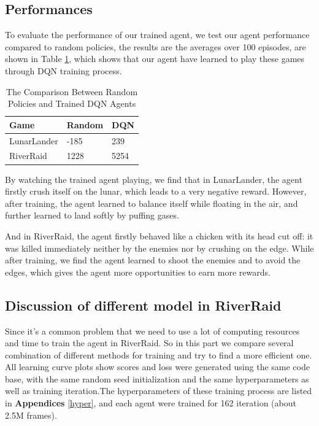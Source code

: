 \documentclass[12pt]{article}
\begin{document}
\subsection{Performances}
To evaluate the performance of our trained agent, we test our agent performance compared to random policies, the results are the averages over 100 episodes, are shown in Table \ref{result}, which shows that our agent have learned to play these games through DQN training process.
\begin{table}[!htp]
    \caption{\label{result}The Comparison Between Random Policies and Trained DQN Agents}
    \centering
    \begin{tabular}{p{100pt}p{100pt}p{50pt}}
    \toprule
    Game & Random & DQN\\
    \midrule
    LunarLander & -185 & 239\\
    RiverRaid & 1228 & 5254\\ 
    \bottomrule
    \end{tabular}
\end{table}

By watching the trained agent playing, we find that in LunarLander, the agent firstly crush itself on the lunar, which leads to a very negative reward. However, after training, the agent learned to balance itself while floating in the air, and further learned to land softly by puffing gases.

And in RiverRaid, the agent firstly behaved like a chicken with its head cut off: it was killed immediately neither by the enemies nor by crushing on the edge. While after training, we find the agent learned to shoot the enemies and to avoid the edges, which gives the agent more opportunities to earn more rewards.



\subsection{Discussion of different model in RiverRaid}
Since it's a common problem that we need to use a lot of computing resources and time to train the agent in RiverRaid. So in this part we compare several combination of different methods for training and try to find a more efficient one. All learning curve plots show scores and loss were generated using the same code base, with the same random seed initialization and the same hyperparameters as well as training iteration.The hyperparameters of these training process are listed in \textbf{Appendices} \ref{hyper}, and each agent were trained for 162 iteration (about 2.5M frames).
\end{document}
